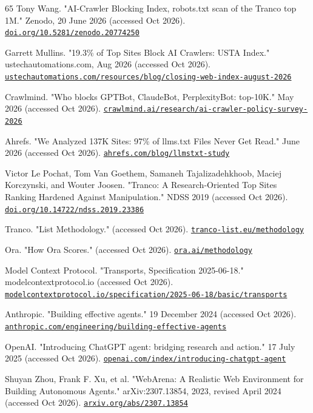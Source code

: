 \documentclass{article}
\begin{document}
\begin{thebibliography}{65}
Tony Wang. "AI-Crawler Blocking Index, robots.txt scan of the Tranco top 1M." Zenodo, 20 June 2026 (accessed Oct 2026). \href{https://doi.org/10.5281/zenodo.20774250}{\nolinkurl{doi.org/10.5281/zenodo.20774250}}

Garrett Mullins. "19.3\% of Top Sites Block AI Crawlers: USTA Index." ustechautomations.com, Aug 2026 (accessed Oct 2026). \href{https://ustechautomations.com/resources/blog/closing-web-index-august-2026}{\nolinkurl{ustechautomations.com/resources/blog/closing-web-index-august-2026}}

Crawlmind. "Who blocks GPTBot, ClaudeBot, PerplexityBot: top-10K." May 2026 (accessed Oct 2026). \href{https://crawlmind.ai/research/ai-crawler-policy-survey-2026}{\nolinkurl{crawlmind.ai/research/ai-crawler-policy-survey-2026}}

Ahrefs. "We Analyzed 137K Sites: 97\% of llms.txt Files Never Get Read." June 2026 (accessed Oct 2026). \href{https://ahrefs.com/blog/llmstxt-study}{\nolinkurl{ahrefs.com/blog/llmstxt-study}}

Victor Le Pochat, Tom Van Goethem, Samaneh Tajalizadehkhoob, Maciej Korczynski, and Wouter Joosen. "Tranco: A Research-Oriented Top Sites Ranking Hardened Against Manipulation." NDSS 2019 (accessed Oct 2026). \href{https://doi.org/10.14722/ndss.2019.23386}{\nolinkurl{doi.org/10.14722/ndss.2019.23386}}

Tranco. "List Methodology." (accessed Oct 2026). \href{https://tranco-list.eu/methodology}{\nolinkurl{tranco-list.eu/methodology}}

Ora. "How Ora Scores." (accessed Oct 2026). \href{https://ora.ai/methodology}{\nolinkurl{ora.ai/methodology}}

Model Context Protocol. "Transports, Specification 2025-06-18." modelcontextprotocol.io (accessed Oct 2026). \href{https://modelcontextprotocol.io/specification/2025-06-18/basic/transports}{\nolinkurl{modelcontextprotocol.io/specification/2025-06-18/basic/transports}}

Anthropic. "Building effective agents." 19 December 2024 (accessed Oct 2026). \href{https://www.anthropic.com/engineering/building-effective-agents}{\nolinkurl{anthropic.com/engineering/building-effective-agents}}

OpenAI. "Introducing ChatGPT agent: bridging research and action." 17 July 2025 (accessed Oct 2026). \href{https://openai.com/index/introducing-chatgpt-agent/}{\nolinkurl{openai.com/index/introducing-chatgpt-agent}}

Shuyan Zhou, Frank F. Xu, et al. "WebArena: A Realistic Web Environment for Building Autonomous Agents." arXiv:2307.13854, 2023, revised April 2024 (accessed Oct 2026). \href{https://arxiv.org/abs/2307.13854}{\nolinkurl{arxiv.org/abs/2307.13854}}

\end{thebibliography}
\end{document}
